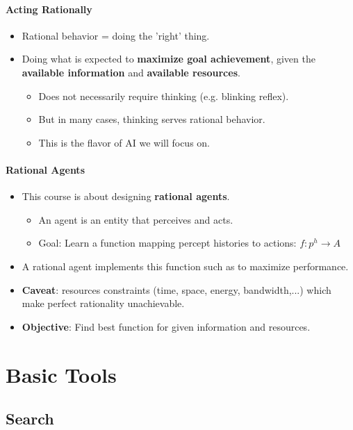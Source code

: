 \documentclass[10pt, a4paper, oneside]{book}
\theoremstyle{theoremdd}
\theoremstyle{remark}
\begin{document}
\subsection*{Acting Rationally}
\begin{itemize}
\item Rational behavior = doing the 'right' thing.
\item Doing what is expected to \textbf{maximize goal achievement}, given the \textbf{available information} and \textbf{available resources}.
\begin{itemize}
\item Does not necessarily require thinking (e.g. blinking reflex).
\item But in many cases, thinking serves rational behavior.
\item This is the flavor of AI we will focus on.
\end{itemize}
\end{itemize}

\subsection*{Rational Agents}
\begin{itemize}
\item This course is about designing \textbf{rational agents}.
\begin{itemize}
\item An agent is an entity that perceives and acts.
\item Goal: Learn a function mapping percept histories to actions: $f: p^{h} \rightarrow A$
\end{itemize}
\item A rational agent implements this function such as to maximize performance.
\item \textbf{Caveat}: resources constraints (time, space, energy, bandwidth,...) which make perfect rationality unachievable.
\item \textbf{Objective}: Find best function for given information and resources.
\end{itemize}

\part{Basic Tools}
\chapter{Search}
\end{document}
